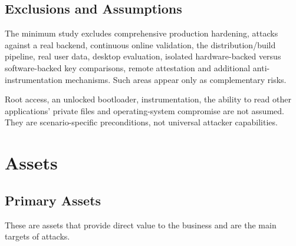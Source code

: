 \documentclass{article}
\begin{document}
\subsection{Exclusions and Assumptions}

The minimum study excludes comprehensive production hardening, attacks against a real backend, continuous online validation, the distribution/build pipeline, real user data, desktop evaluation, isolated hardware-backed versus software-backed key comparisons, remote attestation and additional anti-instrumentation mechanisms. Such areas appear only as complementary risks.

Root access, an unlocked bootloader, instrumentation, the ability to read other applications' private files and operating-system compromise are not assumed. They are scenario-specific preconditions, not universal attacker capabilities.

\newpage

\section{Assets}

\subsection{Primary Assets}

These are assets that provide direct value to the business and are the main targets of attacks.  
\end{document}
